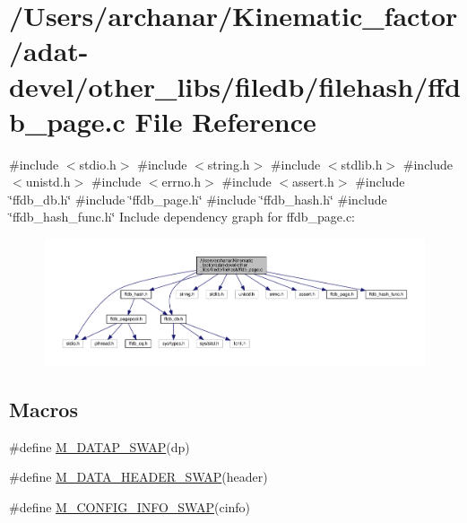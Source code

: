 \hypertarget{adat-devel_2other__libs_2filedb_2filehash_2ffdb__page_8c}{}\section{/\+Users/archanar/\+Kinematic\+\_\+factor/adat-\/devel/other\+\_\+libs/filedb/filehash/ffdb\+\_\+page.c File Reference}
\label{adat-devel_2other__libs_2filedb_2filehash_2ffdb__page_8c}
{\ttfamily \#include $<$stdio.\+h$>$}\newline
{\ttfamily \#include $<$string.\+h$>$}\newline
{\ttfamily \#include $<$stdlib.\+h$>$}\newline
{\ttfamily \#include $<$unistd.\+h$>$}\newline
{\ttfamily \#include $<$errno.\+h$>$}\newline
{\ttfamily \#include $<$assert.\+h$>$}\newline
{\ttfamily \#include \char`\"{}ffdb\+\_\+db.\+h\char`\"{}}\newline
{\ttfamily \#include \char`\"{}ffdb\+\_\+page.\+h\char`\"{}}\newline
{\ttfamily \#include \char`\"{}ffdb\+\_\+hash.\+h\char`\"{}}\newline
{\ttfamily \#include \char`\"{}ffdb\+\_\+hash\+\_\+func.\+h\char`\"{}}\newline
Include dependency graph for ffdb\+\_\+page.\+c\+:
\nopagebreak
\begin{figure}[H]
\begin{center}
\leavevmode
\includegraphics[width=350pt]{d0/d68/adat-devel_2other__libs_2filedb_2filehash_2ffdb__page_8c__incl}
\end{center}
\end{figure}
\subsection*{Macros}
\begin{DoxyCompactItemize}
\item 
\#define \mbox{\hyperlink{adat-devel_2other__libs_2filedb_2filehash_2ffdb__page_8c_a530943e90468133a0cc53d0fb752cfcb}{M\+\_\+\+D\+A\+T\+A\+P\+\_\+\+S\+W\+AP}}(dp)
\item 
\#define \mbox{\hyperlink{adat-devel_2other__libs_2filedb_2filehash_2ffdb__page_8c_a66223908ca98eb9b0172bd57425ee6c6}{M\+\_\+\+D\+A\+T\+A\+\_\+\+H\+E\+A\+D\+E\+R\+\_\+\+S\+W\+AP}}(header)
\item 
\#define \mbox{\hyperlink{adat-devel_2other__libs_2filedb_2filehash_2ffdb__page_8c_ad1406cd2c8fb1cb6be848850dc9b6e59}{M\+\_\+\+C\+O\+N\+F\+I\+G\+\_\+\+I\+N\+F\+O\+\_\+\+S\+W\+AP}}(cinfo)
\end{DoxyCompactItemize}

